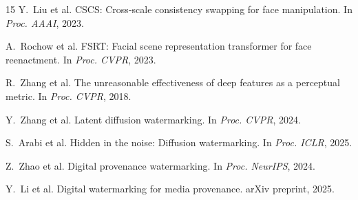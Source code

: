 \documentclass{article}
\begin{document}
\begin{thebibliography}{15}
Y.~Liu et al.
\newblock CSCS: Cross-scale consistency swapping for face manipulation.
\newblock In \textit{Proc. AAAI}, 2023.

A.~Rochow et al.
\newblock FSRT: Facial scene representation transformer for face reenactment.
\newblock In \textit{Proc. CVPR}, 2023.

R.~Zhang et al.
\newblock The unreasonable effectiveness of deep features as a perceptual metric.
\newblock In \textit{Proc. CVPR}, 2018.

Y.~Zhang et al.
\newblock Latent diffusion watermarking.
\newblock In \textit{Proc. CVPR}, 2024.

S.~Arabi et al.
\newblock Hidden in the noise: Diffusion watermarking.
\newblock In \textit{Proc. ICLR}, 2025.

Z.~Zhao et al.
\newblock Digital provenance watermarking.
\newblock In \textit{Proc. NeurIPS}, 2024.

Y.~Li et al.
\newblock Digital watermarking for media provenance.
\newblock arXiv preprint, 2025.

\end{thebibliography}
\end{document}
